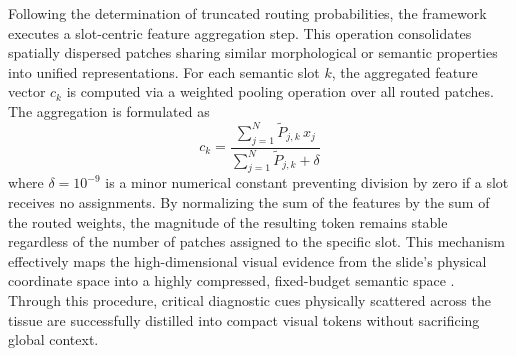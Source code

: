 \documentclass[runningheads]{llncs}
\begin{document}
Following the determination of truncated routing probabilities, the framework executes a slot-centric feature aggregation step. This operation consolidates spatially dispersed patches sharing similar morphological or semantic properties into unified representations. For each semantic slot $k$, the aggregated feature vector $c_k$ is computed via a weighted pooling operation over all routed patches. The aggregation is formulated as 
\begin{equation}
c_k = 
\frac{
\sum_{j=1}^{N} \tilde{P}_{j,k} \, x_j
}{
\sum_{j=1}^{N} \tilde{P}_{j,k} + \delta
}
\end{equation}
where $\delta = 10^{-9}$ is a minor numerical constant preventing division by zero if a slot receives no assignments. By normalizing the sum of the features by the sum of the routed weights, the magnitude of the resulting token remains stable regardless of the number of patches assigned to the specific slot. This mechanism effectively maps the high-dimensional visual evidence from the slide's physical coordinate space into a highly compressed, fixed-budget semantic space \citep{young2026scalar}. Through this procedure, critical diagnostic cues physically scattered across the tissue are successfully distilled into compact visual tokens without sacrificing global context.



\end{document}
